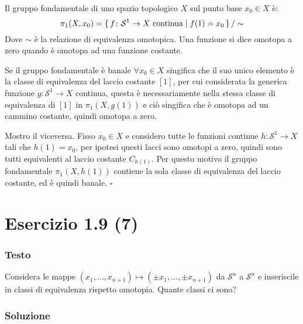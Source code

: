 \documentclass[10pt, toc=sectionentrywithdots]{scrartcl}
\newcommand{\Sph}[1][]{\mathcal{S}^#1}
\begin{document}
Il gruppo fondamentale di uno spazio topologico $ X $ sul punto base $ x_0 \in X $
è:
\[
  \pi_1(X,x_0) = \set{ f \colon \Sph{1} \to X \text{ continua} | f(1) = x_0 } \slash \sim
\]
Dove $ \sim $ è la relazione di equivalenza omotopica. Una funzione si dice
omotopa a zero quando è omotopa ad una funzione costante.

Se il gruppo fondamentale è banale $ \forall x_0 \in X $ singifica che il suo unico elemento
è la classe di equivalenza del laccio costante $ [1] $, per cui considerata
la generica funzione $ g \colon \Sph{1} \to X $ continua, questa è necessariamente
nella stessa classe di equivalenza di $ [1] $ in $ \pi_1(X, g(1)) $ e ciò singifica
che è omotopa ad un cammino costante, quindi omotopa a zero.

Mostro il viceversa. Fisso $ x_0 \in X $ e considero tutte le funzioni continue
$ h \colon \Sph{1} \to X $ tali che $ h(1) = x_0 $, per ipotesi questi lacci sono
omotopi a zero, quindi sono tutti equivalenti al laccio costante $ C_{h(1)} $.
Per questo motivo il gruppo fondamentale $ \pi_1(X, h(1)) $ contiene la sola
classe di equivalenza del laccio costante, ed è quindi banale. \hfill $ \square $

\section[1.9 (7)]{Esercizio 1.9 (7)}
\label{esercizio:grado_sfere}

\subsubsection*{Testo}

Considera le mappe $ (x_1, \dots, x_{n+1}) \mapsto (\pm x_1, \dots, \pm x_{n+1}) $ da $ \Sph{n} $ a $ \Sph{n} $
e inseriscile in classi di equivalenza rispetto omotopia. Quante classi ci sono?

\subsubsection*{Soluzione}
\end{document}
